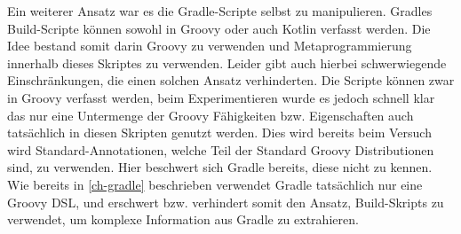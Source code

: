 Ein weiterer Ansatz war es die Gradle-Scripte selbst zu manipulieren.
Gradles Build-Scripte können sowohl in Groovy oder auch Kotlin verfasst werden.
Die Idee bestand somit darin Groovy zu verwenden und Metaprogrammierung innerhalb dieses Skriptes zu verwenden.
Leider gibt auch hierbei schwerwiegende Einschränkungen, die einen solchen Ansatz verhinderten.
Die Scripte können zwar in Groovy verfasst werden, beim Experimentieren wurde es jedoch schnell klar das nur eine Untermenge der Groovy Fähigkeiten bzw. Eigenschaften auch tatsächlich in diesen Skripten genutzt werden.
Dies wird bereits beim Versuch wird Standard-Annotationen, welche Teil der Standard Groovy Distributionen sind, zu verwenden.
Hier beschwert sich Gradle bereits, diese nicht zu kennen.
Wie bereits in \ref{ch-gradle} beschrieben verwendet Gradle tatsächlich nur eine Groovy DSL, und erschwert bzw. verhindert somit den Ansatz, Build-Skripts zu verwendet, um komplexe Information aus Gradle zu extrahieren.
